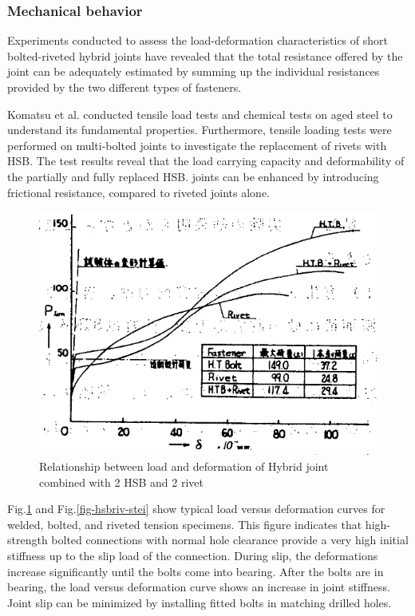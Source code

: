 \subsubsection{Mechanical behavior}

Experiments conducted to assess the load-deformation characteristics of short bolted-riveted hybrid joints have revealed that the total resistance offered by the joint can be adequately estimated by summing up the individual resistances provided by the two different types of fasteners.

Komatsu et al.\cite{KOMATSU2015} conducted tensile load tests and chemical tests on aged steel to understand its fundamental properties. Furthermore, tensile loading tests were performed on multi-bolted joints to investigate the replacement of rivets with HSB. The test results reveal that the load carrying capacity and deformability of the partially and fully replaced HSB. joints can be enhanced by introducing frictional resistance, compared to riveted joints alone.

\begin{figure}[htbp]
    \centering
\includegraphics[width=0.65\linewidth]{imgs//ch2/hsbrivet-1967-pd.png}
    \caption{Relationship between load and deformation of Hybrid joint combined with 2 HSB and 2 rivet \cite{funahashi1967Experimental}}
    \label{fig-hsbriv-fune}
\end{figure}

Fig.\ref{fig-hsbriv-fune} \cite{funahashi1967Experimental} and Fig.\ref{fig-hsbriv-stei} \cite{steinhardt1969-hybrid} show typical load versus deformation curves for welded, bolted, and riveted tension specimens. This figure indicates that high-strength bolted connections with normal hole clearance provide a very high initial stiffness up to the slip load of the connection. During slip, the deformations increase significantly until the bolts come into bearing. After the bolts are in bearing, the load versus deformation curve shows an increase in joint stiffness. Joint slip can be minimized by installing fitted bolts in matching drilled holes.


